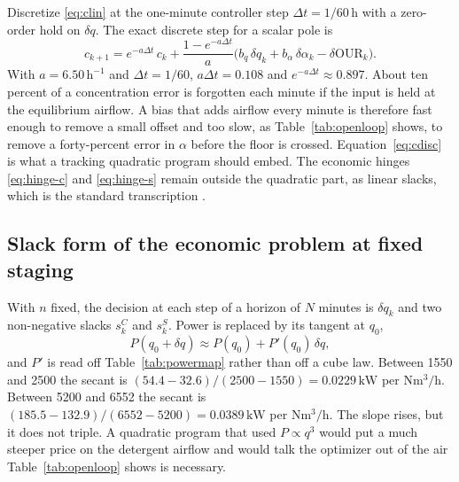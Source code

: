 Discretize \eqref{eq:clin} at the one-minute controller step $\Delta t=1/60\,\mathrm{h}$ with a zero-order hold on $\delta q$. The exact discrete step for a scalar pole is
\begin{equation}
\label{eq:cdisc}
c_{k+1}
=
e^{-a\Delta t}\,c_{k}
+
\frac{1-e^{-a\Delta t}}{a}
\big(
b_{q}\,\delta q_{k}
+
b_{\alpha}\,\delta\alpha_{k}
-
\delta\mathrm{OUR}_{k}
\big).
\end{equation}
With $a=6.50\,\mathrm{h^{-1}}$ and $\Delta t=1/60$, $a\Delta t=0.108$ and $e^{-a\Delta t}\approx 0.897$. About ten percent of a concentration error is forgotten each minute if the input is held at the equilibrium airflow. A bias that adds airflow every minute is therefore fast enough to remove a small offset and too slow, as Table~\ref{tab:openloop} shows, to remove a forty-percent error in $\alpha$ before the floor is crossed. Equation~\eqref{eq:cdisc} is what a tracking quadratic program should embed. The economic hinges \eqref{eq:hinge-c} and \eqref{eq:hinge-s} remain outside the quadratic part, as linear slacks, which is the standard transcription \cite{rawlings2017mpc,boyd2004convex,maciejowski2002}.

\subsection{Slack form of the economic problem at fixed staging}

With $n$ fixed, the decision at each step of a horizon of $N$ minutes is $\delta q_{k}$ and two non-negative slacks $s^{C}_{k}$ and $s^{S}_{k}$. Power is replaced by its tangent at $q_{0}$,
\begin{equation}
\label{eq:ptan}
P(q_{0}+\delta q)
\approx
P(q_{0})
+
P'(q_{0})\,\delta q,
\end{equation}
and $P'$ is read off Table~\ref{tab:powermap} rather than off a cube law. Between \SI{1550}{\nmcph} and \SI{2500}{\nmcph} the secant is $(54.4-32.6)/(2500-1550)=0.0229\,\mathrm{kW}$ per $\mathrm{Nm^{3}/h}$. Between \SI{5200}{\nmcph} and \SI{6552}{\nmcph} the secant is $(185.5-132.9)/(6552-5200)=0.0389\,\mathrm{kW}$ per $\mathrm{Nm^{3}/h}$. The slope rises, but it does not triple. A quadratic program that used $P\propto q^{3}$ would put a much steeper price on the detergent airflow and would talk the optimizer out of the air Table~\ref{tab:openloop} shows is necessary.

